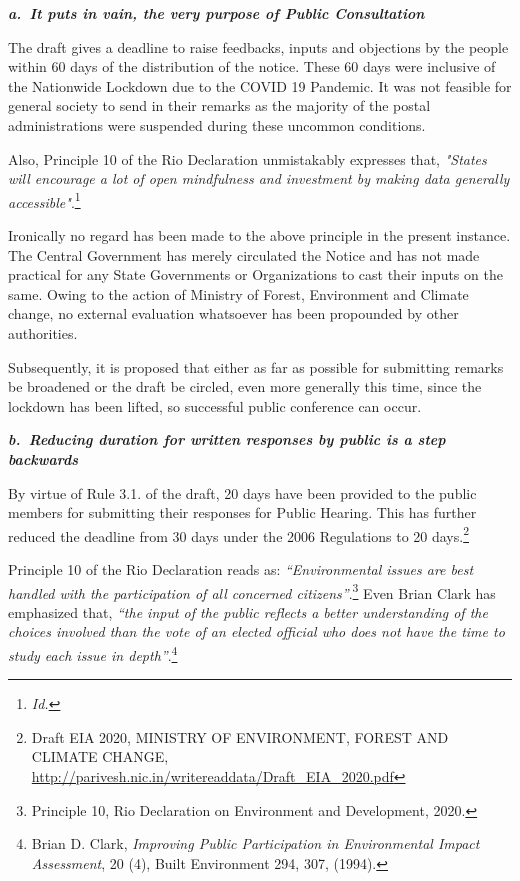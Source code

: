 \begin{multicols}{2}

\noi
{\large\it\bfseries a.~It puts in vain, the very purpose of Public Consultation}

\noi
The draft gives a deadline to raise feedbacks, inputs and objections by the people within 60
days of the distribution of the notice. These 60 days were inclusive of the Nationwide
Lockdown due to the COVID 19 Pandemic. It was not feasible for general society to send in
their remarks as the majority of the postal administrations were suspended during these
uncommon conditions.

\noi
Also, Principle 10 of the Rio Declaration unmistakably expresses that, \textit{"States will encourage
a lot of open mindfulness and investment by making data generally accessible"}.\footnote{\textit{Id.}}

\noi
Ironically no regard has been made to the above principle in the present instance. The Central
Government has merely circulated the Notice and has not made practical for any State
Governments or Organizations to cast their inputs on the same. Owing to the action of
Ministry of Forest, Environment and Climate change, no external evaluation whatsoever has
been propounded by other authorities.

\noi
Subsequently, it is proposed that either as far as possible for submitting remarks be
broadened or the draft be circled, even more generally this time, since the lockdown has been
lifted, so successful public conference can occur.  

\noi
{\large\it\bfseries b.~Reducing duration for written responses by public is a step backwards}

\noi
By virtue of Rule 3.1. of the draft, 20 days have been provided to the public members for
submitting their responses for Public Hearing. This has further reduced the deadline from 30
days under the 2006 Regulations to 20 days.\footnote{Draft EIA 2020, MINISTRY OF ENVIRONMENT, FOREST AND CLIMATE CHANGE,
\url{http://parivesh.nic.in/writereaddata/Draft_EIA_2020.pdf}}

\noi
Principle 10 of the Rio Declaration reads as: \textit{“Environmental issues are best handled with the
participation of all concerned citizens”}.\footnote{Principle 10, Rio Declaration on Environment and Development, 2020.} Even Brian Clark has emphasized that, \textit{“the input
of the public reflects a better understanding of the choices involved than the vote of an
elected official who does not have the time to study each issue in depth”}.\footnote{Brian D. Clark, \textit{Improving Public Participation in Environmental Impact Assessment}, 20 (4), Built
Environment 294, 307, (1994).}


\end{multicols}
